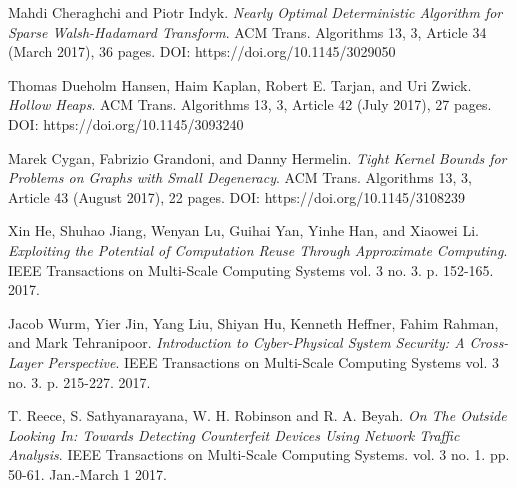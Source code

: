 \documentclass[twocolumn]{article}
\begin{document}
\begin{thebibliography}{9}
Mahdi Cheraghchi and Piotr Indyk. 
\textit{Nearly Optimal Deterministic Algorithm for Sparse Walsh-Hadamard Transform}. 
ACM Trans. Algorithms 13, 3, Article 34 (March 2017), 36 pages. DOI: https://doi.org/10.1145/3029050

Thomas Dueholm Hansen, Haim Kaplan, Robert E. Tarjan, and Uri Zwick.
\textit{Hollow Heaps}. 
ACM Trans. Algorithms 13, 3, Article 42 (July 2017), 27 pages. DOI: https://doi.org/10.1145/3093240

Marek Cygan, Fabrizio Grandoni, and Danny Hermelin.
\textit{Tight Kernel Bounds for Problems on Graphs with Small Degeneracy}. 
ACM Trans. Algorithms 13, 3, Article 43 (August 2017), 22 pages. DOI: https://doi.org/10.1145/3108239

Xin He, Shuhao Jiang, Wenyan Lu, Guihai Yan, Yinhe Han, and Xiaowei Li. 
\textit{Exploiting the Potential of Computation Reuse Through Approximate Computing}.
IEEE Transactions on Multi-Scale Computing Systems vol. 3 no. 3. p. 152-165. 2017.

Jacob Wurm, Yier Jin, Yang Liu, Shiyan Hu, Kenneth Heffner, Fahim Rahman, and Mark Tehranipoor.
\textit{Introduction to Cyber-Physical System Security: A Cross-Layer Perspective}. 
IEEE Transactions on Multi-Scale Computing Systems vol. 3 no. 3. p. 215-227. 2017.

T. Reece, S. Sathyanarayana, W. H. Robinson and R. A. Beyah.
\textit{On The Outside Looking In: Towards Detecting Counterfeit Devices Using Network Traffic Analysis}.
IEEE Transactions on Multi-Scale Computing Systems. vol. 3 no. 1. pp. 50-61. Jan.-March 1 2017.
\end{thebibliography}
\end{document}
